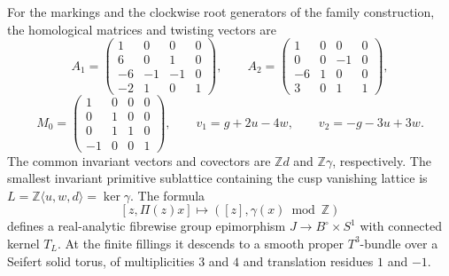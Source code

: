 \begin{proposition}
For the markings and the clockwise root generators of the family construction,
the homological matrices and twisting vectors are
\[
 A_1=\begin{pmatrix}1&0&0&0\\6&0&1&0\\-6&-1&-1&0\\-2&1&0&1\end{pmatrix},
 \qquad
 A_2=\begin{pmatrix}1&0&0&0\\0&0&-1&0\\-6&1&0&0\\3&0&1&1\end{pmatrix},
\]
\[
 M_0=\begin{pmatrix}1&0&0&0\\0&1&0&0\\0&1&1&0\\-1&0&0&1\end{pmatrix},
 \qquad v_1=g+2u-4w,\qquad v_2=-g-3u+3w.
\]
The common invariant vectors and covectors are $\mathbb Zd$ and
$\mathbb Z\gamma$, respectively.  The smallest invariant primitive
sublattice containing the cusp vanishing lattice is
$L=\mathbb Z\langle u,w,d\rangle=\ker\gamma$.
The formula
\[
 [z,\Pi(z)x]\longmapsto([z],\gamma(x)\bmod\mathbb Z)
 \label{mapsI:quotient-eq-1}
\]
defines a real-analytic fibrewise group epimorphism
$J\longrightarrow B^\circ\times S^1$ with connected kernel $T_L$.
At the finite fillings it descends to a smooth proper $T^3$-bundle
over a Seifert solid torus, of multiplicities $3$ and $4$ and
translation residues $1$ and $-1$.
\end{proposition}



